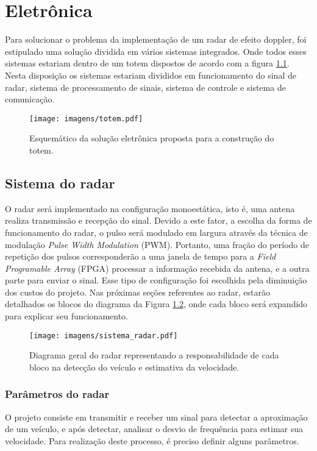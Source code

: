 
\chapter{Eletrônica}

Para solucionar o problema da implementação de um radar de efeito doppler, foi estipulado uma solução dividida em vários sistemas integrados. Onde todos esses sistemas estariam dentro de um totem dispostos de acordo com a figura \ref{esquematico1}. Nesta disposição os sistemas estariam divididos em funcionamento do sinal de radar, sistema de processamento de sinais, sistema de controle e sistema de comunicação.


\begin{figure}[H]
    \centering
    \texttt{[image: imagens/totem.pdf]}
    \caption{Esquemático da solução eletrônica proposta para a construção do totem. }
    \label{esquematico1}
\end{figure}

\section{Sistema do radar}

O radar será implementado na configuração monoestática, isto é, uma antena realiza transmissão e recepção do sinal. Devido a este fator, a escolha da forma de funcionamento do radar, o pulso será modulado em largura através da técnica de modulação \emph{Pulse Width Modulation} (PWM). Portanto, uma fração do período de repetição dos pulsos corresponderão a uma janela de tempo para a \emph{Field Programable Array} (FPGA) processar a informação recebida da antena, e a outra parte para enviar o sinal. Esse tipo de configuração foi escolhida pela diminuição dos custos do projeto.
Nas próximas seções referentes ao radar, estarão detalhados os blocos do diagrama da Figura \ref{processos_geral_radar}, onde cada bloco será expandido para explicar seu funcionamento.

\begin{figure}[H]
    \centering
    \texttt{[image: imagens/sistema\_radar.pdf]}
    \caption{Diagrama geral do radar representando a responsabilidade de cada bloco na detecção do veículo e estimativa da velocidade.}
    \label{processos_geral_radar}
\end{figure}

\subsection{Parâmetros do radar}
O projeto consiste em transmitir e receber um sinal para detectar a aproximação de um veículo, e após detectar, analisar o desvio de frequência para estimar sua velocidade. Para realização deste processo, é preciso definir alguns parâmetros.

